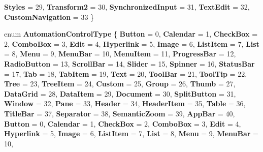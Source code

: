 \begin{DoxyCompactItemize}
{\bfseries Styles} = 29, 
{\bfseries Transform2} = 30, 
{\bfseries Synchronized\+Input} = 31, 
\newline
{\bfseries Text\+Edit} = 32, 
{\bfseries Custom\+Navigation} = 33
 \}
\item 
\mbox{\label{namespace_windows_1_1_u_i_1_1_xaml_1_1_automation_1_1_peers_a545d04e5cb3e01155ab597d749495a0f}} 
enum {\bfseries Automation\+Control\+Type} \{ \newline
{\bfseries Button} = 0, 
{\bfseries Calendar} = 1, 
{\bfseries Check\+Box} = 2, 
{\bfseries Combo\+Box} = 3, 
\newline
{\bfseries Edit} = 4, 
{\bfseries Hyperlink} = 5, 
{\bfseries Image} = 6, 
{\bfseries List\+Item} = 7, 
\newline
{\bfseries List} = 8, 
{\bfseries Menu} = 9, 
{\bfseries Menu\+Bar} = 10, 
{\bfseries Menu\+Item} = 11, 
\newline
{\bfseries Progress\+Bar} = 12, 
{\bfseries Radio\+Button} = 13, 
{\bfseries Scroll\+Bar} = 14, 
{\bfseries Slider} = 15, 
\newline
{\bfseries Spinner} = 16, 
{\bfseries Status\+Bar} = 17, 
{\bfseries Tab} = 18, 
{\bfseries Tab\+Item} = 19, 
\newline
{\bfseries Text} = 20, 
{\bfseries Tool\+Bar} = 21, 
{\bfseries Tool\+Tip} = 22, 
{\bfseries Tree} = 23, 
\newline
{\bfseries Tree\+Item} = 24, 
{\bfseries Custom} = 25, 
{\bfseries Group} = 26, 
{\bfseries Thumb} = 27, 
\newline
{\bfseries Data\+Grid} = 28, 
{\bfseries Data\+Item} = 29, 
{\bfseries Document} = 30, 
{\bfseries Split\+Button} = 31, 
\newline
{\bfseries Window} = 32, 
{\bfseries Pane} = 33, 
{\bfseries Header} = 34, 
{\bfseries Header\+Item} = 35, 
\newline
{\bfseries Table} = 36, 
{\bfseries Title\+Bar} = 37, 
{\bfseries Separator} = 38, 
{\bfseries Semantic\+Zoom} = 39, 
\newline
{\bfseries App\+Bar} = 40, 
{\bfseries Button} = 0, 
{\bfseries Calendar} = 1, 
{\bfseries Check\+Box} = 2, 
\newline
{\bfseries Combo\+Box} = 3, 
{\bfseries Edit} = 4, 
{\bfseries Hyperlink} = 5, 
{\bfseries Image} = 6, 
\newline
{\bfseries List\+Item} = 7, 
{\bfseries List} = 8, 
{\bfseries Menu} = 9, 
{\bfseries Menu\+Bar} = 10, 
\newline

\end{DoxyCompactItemize}
